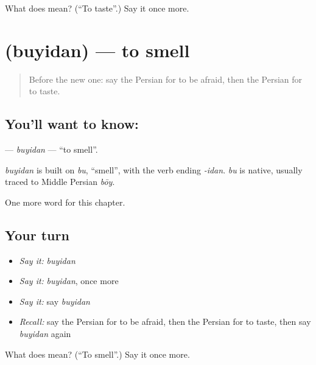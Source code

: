 \begin{tcolorbox}[breakable,colback=teal!4,colframe=teal!35!black,title={Before you move on}]
What does  mean? (\textquotedblleft{}To taste\textquotedblright{}.) Say it once more.
\end{tcolorbox}
\section[\texorpdfstring{\fa{بوییدن} (buyidan)}{بوییدن (buyidan)}]{ (buyidan) — to smell}

\label{lesson:FA-C134-buyidan}



\begin{quote}
Before the new one: say the Persian for to be afraid, then the Persian for to taste.
\end{quote}

\subsection*{You'll want to know: }
\textbf{} — \emph{buyidan} — \textquotedblleft{}to smell\textquotedblright{}.

\begin{cousinweb}
\emph{buyidan} is built on \emph{bu}, \textquotedblleft{}smell\textquotedblright{}, with the verb ending \emph{-idan}. \emph{bu} is native, usually traced to Middle Persian \emph{bōy}.
\end{cousinweb}

\begin{grammarlens}[title={What you've built}]
One more word for this chapter.
\end{grammarlens}

\subsection*{Your turn}
\begin{itemize}
\raggedright
  \item \emph{Say it:} \emph{buyidan}
  \item \emph{Say it:} \emph{buyidan}, once more
  \item \emph{Say it:} say \emph{buyidan}
  \item \emph{Recall:} say the Persian for to be afraid, then the Persian for to taste, then say \emph{buyidan} again
\end{itemize}

\begin{tcolorbox}[breakable,colback=teal!4,colframe=teal!35!black,title={Before you move on}]
What does  mean? (\textquotedblleft{}To smell\textquotedblright{}.) Say it once more.
\end{tcolorbox}
